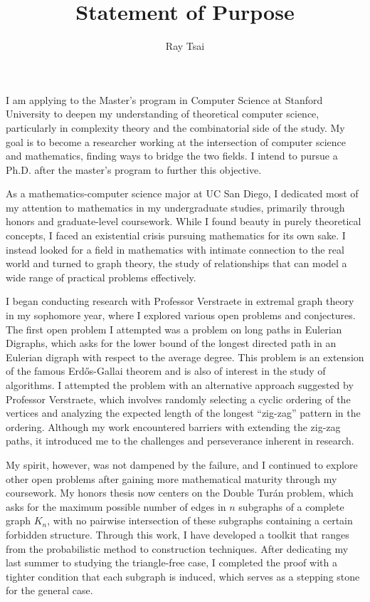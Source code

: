 \documentclass[12pt]{article}
\title{Statement of Purpose}
\author{Ray Tsai}
\date{}
\begin{document}
\maketitle

\vspace{-0.25in}

I am applying to the Master's program in Computer Science at Stanford University to deepen my
understanding of theoretical computer science, particularly in complexity theory and the
combinatorial side of the study. My goal is to become a researcher working at the intersection of
computer science and mathematics, finding ways to bridge the two fields. I intend to pursue a Ph.D.
after the master's program to further this objective.


As a mathematics-computer science major at UC San Diego, I dedicated most of my attention to
mathematics in my undergraduate studies, primarily through honors and graduate-level coursework.
While I found beauty in purely theoretical concepts, I faced an existential crisis pursuing
mathematics for its own sake. I instead looked for a field in mathematics with intimate connection
to the real world and turned to graph theory, the study of relationships that can model a wide range
of practical problems effectively.

I began conducting research with Professor Verstraete in extremal graph theory in my sophomore year,
where I explored various open problems and conjectures. The first open problem I attempted was a
problem on long paths in Eulerian Digraphs, which asks for the lower bound of the longest directed
path in an Eulerian digraph with respect to the average degree. This problem is an extension of the
famous Erdős-Gallai theorem and is also of interest in the study of algorithms. I attempted the
problem with an alternative approach suggested by Professor Verstraete, which involves randomly
selecting a cyclic ordering of the vertices and analyzing the expected length of the longest
``zig-zag'' pattern in the ordering. Although my work encountered barriers with extending the
zig-zag paths, it introduced me to the challenges and perseverance inherent in research.

My spirit, however, was not dampened by the failure, and I continued to explore other open problems
after gaining more mathematical maturity through my coursework. My honors thesis now centers on the
Double Turán problem, which asks for the maximum possible number of edges in $n$ subgraphs of a
complete graph $K_n$, with no pairwise intersection of these subgraphs containing a certain
forbidden structure. Through this work, I have developed a toolkit that ranges from the
probabilistic method to construction techniques. After dedicating my last summer to studying the
triangle-free case, I completed the proof with a tighter condition that each subgraph is induced,
which serves as a stepping stone for the general case. 
\end{document}
